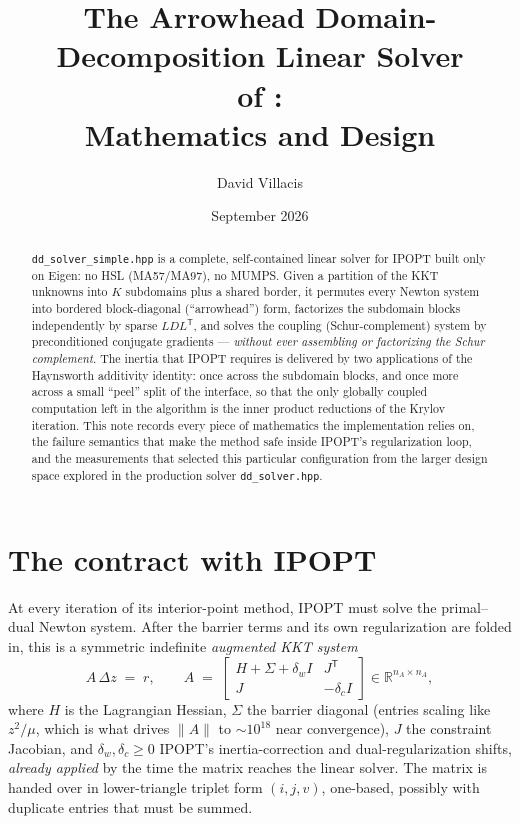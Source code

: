 \documentclass[11pt]{article}
\title{The Arrowhead Domain-Decomposition Linear Solver\\
       of \code{dd\_solver\_simple.hpp}:\\
       Mathematics and Design}
\author{David Villacis}
\date{September 2026}
\newcommand{\R}{\mathbb{R}}
\newcommand{\code}[1]{\texttt{#1}}
\begin{document}
\maketitle

\begin{abstract}
\noindent
\code{dd\_solver\_simple.hpp} is a complete, self-contained linear solver for
IPOPT built only on Eigen: no HSL (MA57/MA97), no MUMPS.  Given a partition of
the KKT unknowns into $K$ subdomains plus a shared border, it permutes every
Newton system into bordered block-diagonal (``arrowhead'') form, factorizes
the subdomain blocks independently by sparse $LDL^{\mathsf T}$, and solves the
coupling (Schur-complement) system by preconditioned conjugate gradients ---
\emph{without ever assembling or factorizing the Schur complement}.  The
inertia that IPOPT requires is delivered by two applications of the Haynsworth
additivity identity: once across the subdomain blocks, and once more across a
small ``peel'' split of the interface, so that the only globally coupled
computation left in the algorithm is the inner product reductions of the
Krylov iteration.  This note records every piece of mathematics the
implementation relies on, the failure semantics that make the method safe
inside IPOPT's regularization loop, and the measurements that selected this
particular configuration from the larger design space explored in the
production solver \code{dd\_solver.hpp}.
\end{abstract}

\tableofcontents

\section{The contract with IPOPT}
\label{sec:contract}

At every iteration of its interior-point method, IPOPT
\cite{waechter2006implementation} must solve the primal--dual Newton system.
After the barrier terms and its own regularization are folded in, this is a
symmetric indefinite \emph{augmented KKT system}
\begin{equation}
  A\,\Delta z \;=\; r,
  \qquad
  A \;=\;
  \begin{bmatrix}
    H + \Sigma + \delta_w I & J^{\mathsf T}\\[2pt]
    J & -\delta_c I
  \end{bmatrix}
  \in \R^{n_A\times n_A},
  \label{eq:kkt}
\end{equation}
where $H$ is the Lagrangian Hessian, $\Sigma$ the barrier diagonal
(entries scaling like $z^2/\mu$, which is what drives $\|A\|$ to
$\sim\!10^{18}$ near convergence), $J$ the constraint Jacobian, and
$\delta_w,\delta_c \ge 0$ IPOPT's inertia-correction and dual-regularization
shifts, \emph{already applied} by the time the matrix reaches the linear
solver.  The matrix is handed over in lower-triangle triplet form
$(i,j,v)$, one-based, possibly with duplicate entries that must be summed.
\end{document}
